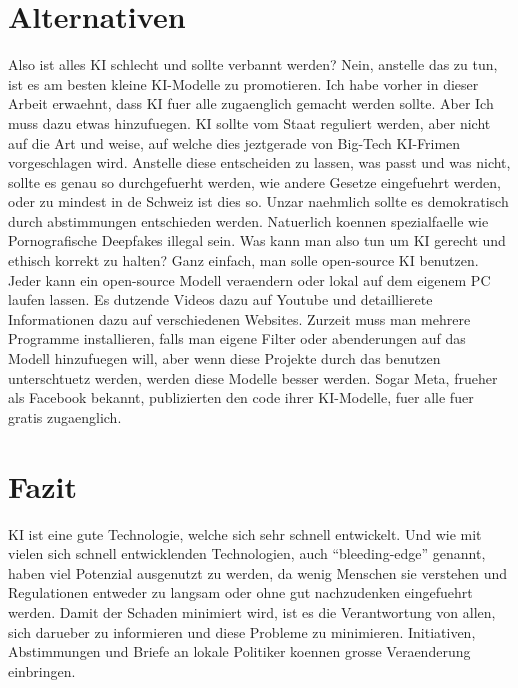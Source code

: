 \documentclass{report}
\begin{document}
\chapter{Alternativen}
Also ist alles KI schlecht und sollte verbannt werden? Nein, anstelle das zu tun, ist es am besten kleine KI-Modelle zu promotieren. Ich habe vorher in dieser Arbeit erwaehnt, dass KI fuer alle zugaenglich gemacht werden sollte. Aber Ich muss dazu etwas hinzufuegen. KI sollte vom Staat reguliert werden, aber nicht auf die Art und weise, auf welche dies jeztgerade von Big-Tech KI-Frimen vorgeschlagen wird. Anstelle diese entscheiden zu lassen, was passt und was nicht, sollte es genau so durchgefuerht werden, wie andere Gesetze eingefuehrt werden, oder zu mindest in de Schweiz ist dies so. Unzar naehmlich sollte es demokratisch durch abstimmungen entschieden werden. Natuerlich koennen spezialfaelle wie Pornografische Deepfakes illegal sein. 
\newline
\newline
Was kann man also tun um KI gerecht und ethisch korrekt zu halten? Ganz einfach, man solle open-source KI benutzen. Jeder kann ein open-source Modell veraendern oder lokal auf dem eigenem PC laufen lassen. Es dutzende Videos dazu auf Youtube und detaillierete Informationen dazu auf verschiedenen Websites. Zurzeit muss man mehrere Programme installieren, falls man eigene Filter oder abenderungen auf das Modell hinzufuegen will, aber wenn diese Projekte durch das benutzen unterschtuetz werden, werden diese Modelle besser werden. Sogar Meta, frueher als Facebook bekannt, publizierten den code ihrer KI-Modelle, fuer alle fuer gratis zugaenglich.
\chapter{Fazit}
KI ist eine gute Technologie, welche sich sehr schnell entwickelt. Und wie mit vielen sich schnell entwicklenden Technologien, auch \enquote{bleeding-edge} genannt, haben viel Potenzial ausgenutzt zu werden, da wenig Menschen sie verstehen und Regulationen entweder zu langsam oder ohne gut nachzudenken eingefuehrt werden. Damit der Schaden minimiert wird, ist es die Verantwortung von allen, sich darueber zu informieren und diese Probleme zu minimieren. Initiativen, Abstimmungen und Briefe an lokale Politiker koennen grosse Veraenderung einbringen.
\nocite{*}
\printbibliography
\end{document}
